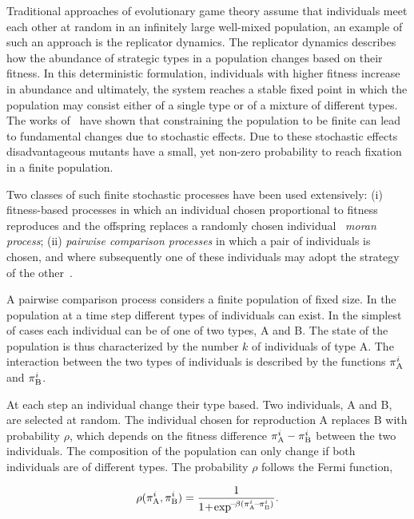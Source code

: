 \documentclass[11pt]{article}
\theoremstyle{plainCl1}
\theoremstyle{plainCl2}
\begin{document}
Traditional approaches of evolutionary game theory assume that individuals meet
each other at random in an infinitely large well-mixed population, an example of
such an approach is the replicator dynamics. The replicator dynamics describes
how the abundance of strategic types in a population changes based on their
fitness. In this deterministic formulation, individuals with higher fitness
increase in abundance and ultimately, the system reaches a stable fixed point in
which the population may consist either of a single type or of a mixture of
different types. The works of~\cite{nowak2004emergence, taylor2004evolutionary,
imhof2005evolutionary, imhof2006evolutionary, traulsen2007pairwise} have shown
that constraining the population to be finite can lead to fundamental changes
due to stochastic effects. Due to these stochastic effects disadvantageous
mutants have a small, yet non-zero probability to reach fixation in a finite
population.

Two classes of such finite stochastic processes have been used extensively: (i)
fitness-based processes in which an individual chosen proportional to fitness
reproduces and the offspring replaces a randomly chosen individual~\cite{nowak2004emergence}
\textit{moran process}; (ii) \textit{pairwise comparison processes} in which a
pair of individuals is chosen, and where subsequently one of these individuals
may adopt the strategy of the other~\cite{traulsen2007pairwise}.

A pairwise comparison process considers a finite population of fixed size. In
the population at a time step different types of individuals can exist. In the
simplest of cases each individual can be of one of two types, A and B. The state
of the population is thus characterized by the number \(k\) of individuals of
type A. The interaction between the two types of individuals is described by the
functions \(\pi _{{\rm A}}^{i}\) and $\pi _{{\rm B}}^{i}$.

At each step an individual change their type based. Two individuals, A and B,
are selected at random. The individual chosen for reproduction A replaces B with
probability \(\rho\), which depends on the fitness difference \(\pi _{{\rm
A}}^{i} - \pi _{{\rm B}}^{i}\) between the two individuals. The composition of
the population can only change if both individuals are of different types. The
probability \(\rho\) follows the Fermi function,

\begin{equation}
  \rho(\pi _{{\rm A}}^{i}, \pi _{{\rm B}}^{i}) = \frac{1}{1\!+\! \exp^{\!-\!\beta (\pi _{{\rm A}}^{i}\!-\!\pi _{{\rm B}}^{i})}}.
\end{equation}
\end{document}
